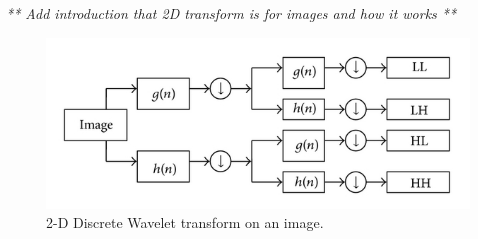 \textit{** Add introduction that 2D transform is for images and how it works **}

\begin{figure}[h]
	\centering
	\includegraphics[width=\textwidth]{2D_DWT.JPG}
	\caption{2-D Discrete Wavelet transform on an image.}
	\label{fig:2D_DWT}
\end{figure}







